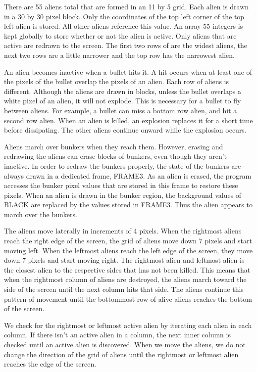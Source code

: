 \documentclass[11pt,letter,oneside]{report}
\begin{document}
There are 55 aliens total that are formed in an 11 by 5 grid. Each alien is drawn in a 30 by 30 pixel block. Only the coordinates of the top left corner of the top left alien is stored. All other aliens reference this value. An array 55 integers is kept globally to store whether or not the alien is active. Only aliens that are active are redrawn to the screen. The first two rows of are the widest aliens, the next two rows are a little narrower and the top row has the narrowest alien.

An alien becomes inactive when a bullet hits it. A hit occurs when at least one of the pixels of the bullet overlap the pixels of an alien. Each row of aliens is different. Although the aliens are drawn in blocks, unless the bullet overlaps a white pixel of an alien, it will not explode. This is necessary for a bullet to fly between aliens. For example, a bullet can miss a bottom row alien, and hit a second row alien. When an alien is killed, an explosion replaces it for a short time before dissipating. The other aliens continue onward while the explosion occurs.

Aliens march over bunkers when they reach them. However, erasing and redrawing the aliens can erase blocks of bunkers, even though they aren't inactive. In order to redraw the bunkers properly, the state of the bunkers are always drawn in a dedicated frame, FRAME3.  As an alien is erased, the program accesses the bunker pixel values that are stored in this frame to restore these pixels. When an alien is drawn in the bunker region, the background values of BLACK are replaced by the values stored in FRAME3. Thus the alien appears to march over the bunkers.

The aliens move laterally in increments of 4 pixels.  When the rightmost aliens reach the right edge of the screen, the grid of aliens move down 7 pixels and start moving left.  When the leftmost aliens reach the left edge of the screen, they move down 7 pixels and start moving right.  The rightmost alien and leftmost alien is the closest alien to the respective sides that has not been killed. This means that when the rightmost column of aliens are destroyed, the aliens march toward the side of the screen until the next column hits that side. The aliens continue this pattern of movement until the bottommost row of alive aliens reaches the bottom of the screen. 

We check for the rightmost or leftmost active alien by iterating each alien in each column. If there isn't an active alien in a column, the next inner column is checked until an active alien is discovered. When we move the aliens, we do not change the direction of the grid of aliens until the rightmost or leftmost alien reaches the edge of the screen.
\end{document}
